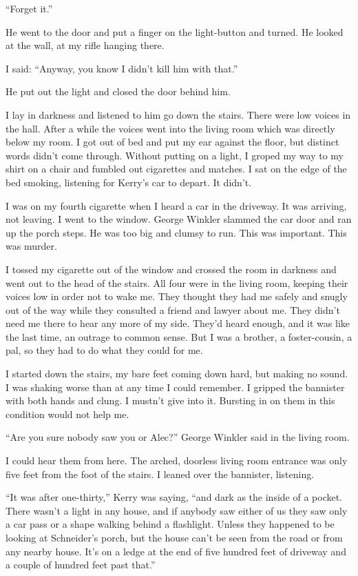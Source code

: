 \documentclass{novel}
\begin{document}
“Forget it.”

He went to the door and put a finger on the light-button and turned. He looked at the wall, at my rifle hanging there.

I said: “Anyway, you know I didn’t kill him with that.”

He put out the light and closed the door behind him.

I lay in darkness and listened to him go down the stairs. There were low voices in the hall. After a while the voices went into the living room which was directly below my room. I got out of bed and put my ear against the floor, but distinct words didn’t come through. Without putting on a light, I groped my way to my shirt on a chair and fumbled out cigarettes and matches. I sat on the edge of the bed smoking, listening for Kerry’s car to depart. It didn’t.

\scenestars

I was on my fourth cigarette when I heard a car in the driveway. It was arriving, not leaving. I went to the \mbox{window}. George Winkler slammed the car door and ran up the porch steps. He was too big and clumsy to run. This was important. This was murder.

I tossed my cigarette out of the window and crossed the room in darkness and went out to the head of the stairs. All four were in the living room, keeping their voices low in order not to wake me. They thought they had me safely and snugly out of the way while they consulted a friend and lawyer about me. They didn’t need me there to hear any more of my side. They’d heard enough, and it was like the last time, an outrage to common sense. But I was a brother, a foster-cousin, a pal, so they had to do what they could for me.

I started down the stairs, my bare feet coming down hard, but making no sound. I was shaking worse than at any time I could remember. I gripped the bannister with both hands and clung. I mustn’t give into it. Bursting in on them in this condition would not help me.

“Are you sure nobody saw you or Alec?” George Winkler said in the living room.

I could hear them from here. The arched, doorless living room entrance was only five feet from the foot of the stairs. I leaned over the bannister, listening.

“It was after one-thirty,” Kerry was saying, “and dark as the inside of a pocket. There wasn’t a light in any house, and if anybody saw either of us they saw only a car pass or a shape walking behind a flashlight. Unless they happened to be looking at Schneider’s porch, but the house can’t be seen from the road or from any nearby house. It’s on a ledge at the end of five hundred feet of driveway and a couple of hundred feet past that.”
\end{document}
